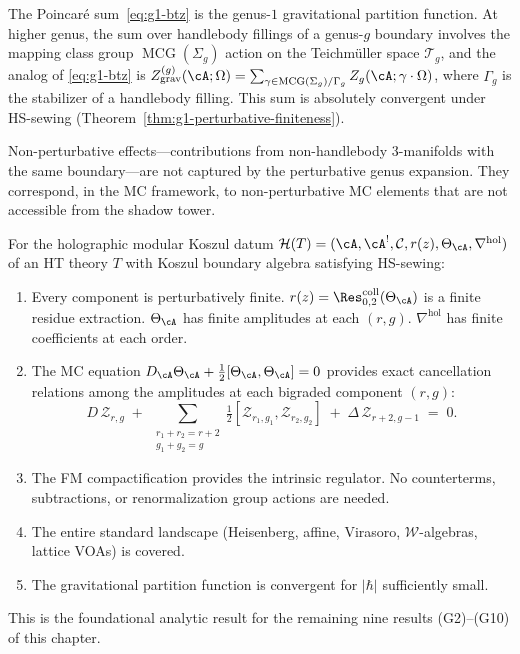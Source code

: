 \begin{remark}%
\label{rem:g1-farey-tail}%
%
%
The Poincar\'e sum~\eqref{eq:g1-btz} is the genus-$1$
gravitational partition function.  At higher genus, the sum
over handlebody fillings of a genus-$g$ boundary involves
the mapping class group $\operatorname{MCG}(\Sigma_g)$ action
on the Teichm\"uller space $\mathcal{T}_g$, and the analog of
\eqref{eq:g1-btz} is
$Z_{\mathrm{grav}}^{(g)}(\cA;\Omega) =
\sum_{\gamma \in \operatorname{MCG}(\Sigma_g)/\Gamma_g}
Z_g(\cA;\gamma \cdot \Omega)$,
where $\Gamma_g$ is the stabilizer of a handlebody filling.
This sum is absolutely convergent under HS-sewing
(Theorem~\ref{thm:g1-perturbative-finiteness}).

Non-perturbative effects---contributions from non-handlebody
3-manifolds with the same boundary---are not captured by the
perturbative genus expansion.  They correspond, in the MC
framework, to non-perturbative MC elements that are not
accessible from the shadow tower.
\end{remark}

\begin{theorem}%
\label{thm:g1-finiteness-summary}%
%
For the holographic modular Koszul datum
$\mathcal{H}(T) = (\cA, \cA^!, \mathcal{C}, r(z),
\Theta_\cA, \nabla^{\mathrm{hol}})$
of an HT theory $T$ with Koszul boundary algebra satisfying
HS-sewing:
\begin{enumerate}[label=\textup{(\alph*)}]
\item Every component is perturbatively finite.
  $r(z) = \Res^{\mathrm{coll}}_{0,2}(\Theta_\cA)$ is a
  finite residue extraction.
  $\Theta_\cA$ has finite amplitudes at each $(r,g)$.
  $\nabla^{\mathrm{hol}}$ has finite coefficients at each
  order.
\item The MC equation
  $D_\cA\Theta_\cA + \frac{1}{2}[\Theta_\cA,\Theta_\cA] = 0$
  provides exact cancellation relations among the amplitudes
  at each bigraded component $(r,g)$:
  \begin{equation}\label{eq:g1-mc-cancellation}
  D\,\mathcal{Z}_{r,g}
  \;+\;
  \sum_{\substack{r_1+r_2=r+2 \\ g_1+g_2=g}}
  \tfrac{1}{2}[\mathcal{Z}_{r_1,g_1},
  \mathcal{Z}_{r_2,g_2}]
  \;+\;
  \Delta\,\mathcal{Z}_{r+2,g-1}
  \;=\; 0.
  \end{equation}
\item The FM compactification provides the intrinsic regulator.
  No counterterms, subtractions, or renormalization group
  actions are needed.
\item The entire standard landscape (Heisenberg, affine,
  Virasoro, $\mathcal{W}$-algebras, lattice VOAs) is covered.
\item The gravitational partition function is convergent for
  $|\hbar|$ sufficiently small.
\end{enumerate}
This is the foundational analytic result for the remaining
nine results
\textup{(G2)--(G10)} of this chapter.
\end{theorem}

